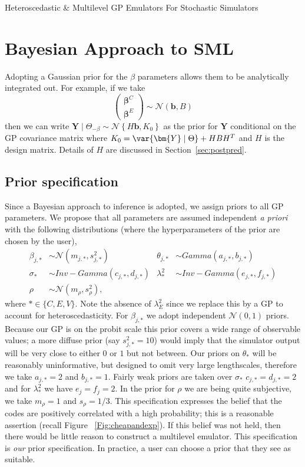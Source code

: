\begin{chapter}{Heteroscedastic \& Multilevel GP Emulators For Stochastic Simulators\label{Ch:Hetsml}}
\section{Bayesian Approach to SML}

Adopting a Gaussian prior for the $\beta$ parameters allows them to be analytically integrated out. For example, if we take
\begin{equation*}
  \begin{pmatrix}
    \bm{\beta}^C \\ \bm{\beta}^E
  \end{pmatrix}\sim \mathcal{N}(\bm{b}, B)
\end{equation*}
then we can write $\bm{Y}\mid\Theta_{-\beta}\sim\mathcal{N} \left\{ H\bm{b}, K_0  \right\}$ as the prior for $\bm{Y}$ conditional on the GP covariance matrix where $K_0=\var\{\bm{Y}\mid \Theta\} + HBH^T$ and $H$ is the design matrix. Details of $H$ are discussed in Section~\ref{sec:postpred}.

\subsection{Prior specification}

Since a Bayesian approach to inference is adopted, we assign priors to all GP parameters. We propose that all parameters are assumed independent \textit{a priori} with the following distributions (where the hyperparameters of the prior are chosen by the user),
\begin{align}
\beta_{j, *} &\sim \mathcal{N}(m_{j,*}, s_{j,*}^2) & \theta_{j,*} &\sim  Gamma(a_{j, *}, b_{j, *}) \\
\sigma_* &\sim Inv-Gamma(c_{j,*}, d_{j,*}) & \lambda_*^2 &\sim Inv-Gamma(e_{j,*}, f_{j,*}) \\
\rho &\sim \mathcal{N}(m_{\rho}, s_{\rho}^2),&
\end{align}
\noindent where $* \in \{ C, E, V \}$. Note the absence of $\lambda^2_{E}$ since we replace this by a GP to account for heteroscedasticity. For $\beta_{j,*}$ we adopt independent $\mathcal{N}(0,1)$ priors. Because our GP is on the probit scale this prior covers a wide range of observable values; a more diffuse prior (say $s_{j,*}^2=10$) would imply that the simulator output will be very close to either $0$ or $1$ but not between. Our priors on $\theta_{*}$ will be reasonably uninformative, but designed to omit very large lengthscales, therefore we take $a_{j,*} = 2$ and $b_{j,*} = 1$. Fairly weak priors are taken over $\sigma_*$ $c_{j,*}=d_{j,*}=2$ and for $\lambda^2_*$ we have $e_j = f_j=2$. In the prior for $\rho$ we are being quite subjective, we take $m_\rho = 1$ and $s_\rho = 1/3$. This specification expresses the belief that the codes are positively correlated with a high probability; this is a reasonable assertion (recall Figure ~\ref{Fig:cheapandexp}). If this belief was not held, then there would be little reason to construct a multilevel emulator. This specification is \textit{our} prior specification. In practice, a user can choose a prior that they see as suitable.

\end{chapter}
